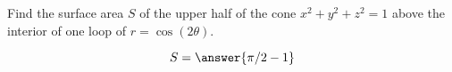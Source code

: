 \documentclass{ximera}
\author{David Guichard \and Neal Koblitz \and H. Jerome Keisler \and Albert Scheller \and Barry Balof \and Mike Wills \and Matthew Carr}
\begin{document}
\begin{exercise}





Find the surface area $S$ of the upper half of the cone $x^2+y^2+z^2=1$ above the interior of one loop of $r=\cos(2\theta)$.

\begin{prompt}
\[
S=\answer{\pi/2-1}
\]
\end{prompt}



\end{exercise}
\end{document}
